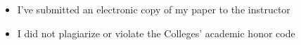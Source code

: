 \documentclass[11pt]{article}
\begin{document}
\vspace{0.5cm}

\begin{minipage}{0.135\textwidth}
\end{minipage}
\begin{minipage}{0.8\textwidth}
\hline\vspace{0.25cm}
\begin{itemize}\itemsep-0.25em
	\item I've submitted an electronic copy of my paper to the instructor
\end{itemize}	
\hline\vspace{0.25cm} 
\end{minipage}

\vspace{0.5cm}

\begin{minipage}{0.135\textwidth}
\end{minipage}
\begin{minipage}{0.8\textwidth}
\hline\vspace{0.25cm}
\begin{itemize}\itemsep-0.25em
	\item I did not plagiarize or violate the Colleges' academic honor code
\end{itemize}	
\hline\vspace{0.25cm} 
\end{minipage}

\end{document}
